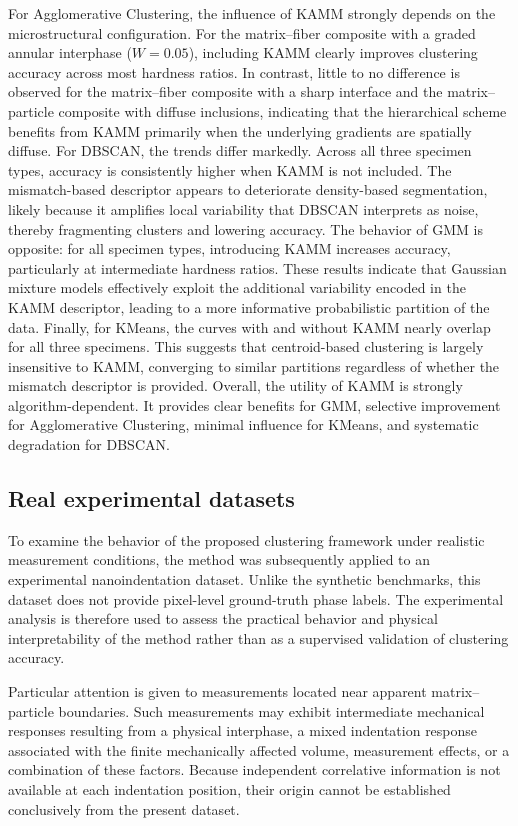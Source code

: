 \documentclass[final,3p,times]{elsarticle}
\begin{document}
For Agglomerative Clustering, the influence of KAMM strongly depends on the microstructural configuration. For the matrix--fiber composite with a graded annular interphase ($W=0.05$), including KAMM clearly improves clustering accuracy across most hardness ratios. In contrast, little to no difference is observed for the matrix--fiber composite with a sharp interface and the matrix--particle composite with diffuse inclusions, indicating that the hierarchical scheme benefits from KAMM primarily when the underlying gradients are spatially diffuse. For DBSCAN, the trends differ markedly. Across all three specimen types, accuracy is consistently higher when KAMM is not included. The mismatch-based descriptor appears to deteriorate density-based segmentation, likely because it amplifies local variability that DBSCAN interprets as noise, thereby fragmenting clusters and lowering accuracy. The behavior of GMM is opposite: for all specimen types, introducing KAMM increases accuracy, particularly at intermediate hardness ratios. These results indicate that Gaussian mixture models effectively exploit the additional variability encoded in the KAMM descriptor, leading to a more informative probabilistic partition of the data. Finally, for KMeans, the curves with and without KAMM nearly overlap for all three specimens. This suggests that centroid-based clustering is largely insensitive to KAMM, converging to similar partitions regardless of whether the mismatch descriptor is provided. Overall, the utility of KAMM is strongly algorithm-dependent. It provides clear benefits for GMM, selective improvement for Agglomerative Clustering, minimal influence for KMeans, and systematic degradation for DBSCAN.

\subsection{Real experimental datasets}
\label{sec:results_experimental}

To examine the behavior of the proposed clustering framework under realistic measurement conditions, the method was subsequently applied to an experimental nanoindentation dataset. Unlike the synthetic benchmarks, this dataset does not provide pixel-level ground-truth phase labels. The experimental analysis is therefore used to assess the practical behavior and physical interpretability of the method rather than as a supervised validation of clustering accuracy.

Particular attention is given to measurements located near apparent matrix--particle boundaries. Such measurements may exhibit intermediate mechanical responses resulting from a physical interphase, a mixed indentation response associated with the finite mechanically affected volume, measurement effects, or a combination of these factors. Because independent correlative information is not available at each indentation position, their origin cannot be established conclusively from the present dataset.
\end{document}
